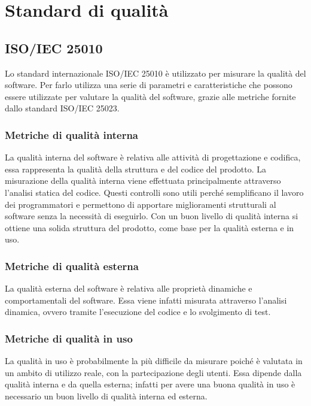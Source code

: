 \appendix
\section{Standard di qualità}
	\subsection{ISO/IEC 25010}
		Lo standard internazionale ISO/IEC 25010 è utilizzato per misurare la qualità del software.
		Per farlo utilizza una serie di parametri e caratteristiche che possono essere utilizzate per valutare la qualità del software, grazie alle metriche fornite dallo standard ISO/IEC 25023.
		\subsubsection{Metriche di qualità interna}
			La qualità interna del software è relativa alle attività di progettazione e codifica, essa rappresenta la qualità della struttura e del codice del prodotto.
			La misurazione della qualità interna viene effettuata principalmente attraverso l'analisi statica del codice.
			Questi controlli sono utili perché semplificano il lavoro dei programmatori e permettono di apportare miglioramenti strutturali al software senza la necessità di eseguirlo.
			Con un buon livello di qualità interna si ottiene una solida struttura del prodotto, come base per la qualità esterna e in uso.
		\subsubsection{Metriche di qualità esterna}
			La qualità esterna del software è relativa alle proprietà dinamiche e comportamentali del software. Essa viene infatti misurata attraverso l'analisi dinamica, ovvero tramite l'esecuzione del codice e lo svolgimento di test.
		\subsubsection{Metriche di qualità in uso}
			La qualità in uso è probabilmente la più difficile da misurare poiché è valutata in un ambito di utilizzo reale, con la partecipazione degli utenti.
			Essa dipende dalla qualità interna e da quella esterna; infatti per avere una buona qualità in uso è necessario un buon livello di qualità interna ed esterna.
